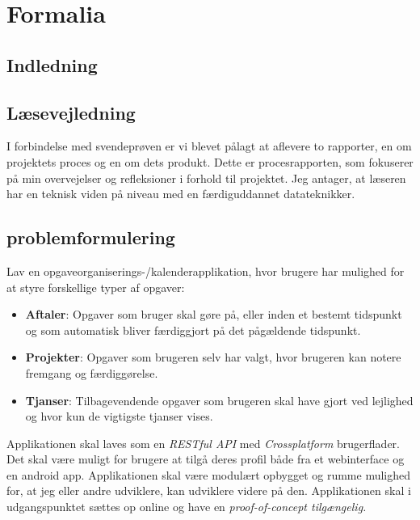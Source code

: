 \documentclass{report}
\begin{document}
\maketitle
\makeTechTitlecard
\tableofcontents

\chapter{Formalia}

\section{Indledning}

\section{Læsevejledning}
I forbindelse med svendeprøven er vi blevet pålagt at aflevere to rapporter, en om projektets proces og en om dets produkt. Dette er procesrapporten, som  fokuserer på min overvejelser og refleksioner i forhold til projektet.
Jeg antager, at læseren har en teknisk viden på niveau med en færdiguddannet datateknikker.


\section{problemformulering}
Lav en opgaveorganiserings-/kalenderapplikation, hvor brugere har mulighed for at styre forskellige typer af opgaver:
\begin{itemize}
\item \textbf{Aftaler}: Opgaver som bruger skal gøre på, eller inden et bestemt tidspunkt og som automatisk bliver færdiggjort på det pågældende tidspunkt.
\item \textbf{Projekter}: Opgaver som brugeren selv har valgt, hvor brugeren kan notere fremgang og færdiggørelse.
\item \textbf{Tjanser}: Tilbagevendende opgaver som brugeren skal have gjort ved lejlighed og hvor kun de vigtigste tjanser vises. 
\end{itemize}	
Applikationen skal laves som en \textit{RESTful API} med \textit{Crossplatform} brugerflader. Det skal være muligt for brugere at tilgå deres profil både fra et webinterface og en android app.
Applikationen skal være modulært opbygget og rumme mulighed for, at jeg eller andre udviklere, kan udviklere videre på den.
Applikationen skal i udgangspunktet sættes op online og have en \textit{proof-of-concept tilgængelig.}
\end{document}
